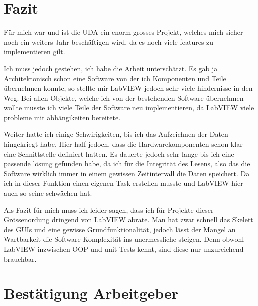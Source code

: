 \documentclass[10pt]{scrartcl}
\begin{document}
\section{Fazit}
Für mich war und ist die UDA ein enorm grosses Projekt, welches mich sicher noch ein weiters Jahr beschäftigen wird, da es noch viele features zu implementieren gilt.

Ich muss jedoch gestehen, ich habe die Arbeit unterschätzt. Es gab ja Architektonisch schon eine Software von der ich Komponenten und Teile übernehmen konnte, so stellte mir LabVIEW jedoch sehr viele hindernisse in den Weg. Bei allen Objekte, welche ich von der bestehenden Software übernehmen wollte musste ich viele Teile der Software neu implementieren, da LabVIEW viele probleme mit abhängikeiten bereitete.

Weiter hatte ich einige Schwirigkeiten, bis ich das Aufzeichnen der Daten hingekriegt habe. Hier half jedoch, dass die Hardwarekomponenten schon klar eine Schnittstelle definiert hatten. Es dauerte jedoch sehr lange bis ich eine passende lösung gefunden habe, da ich für die Integrität des Lesens, also das die Software wirklich immer in einem gewissen Zeitintervall die Daten speichert. Da ich in dieser Funktion einen eigenen Task erstellen musste und LabVIEW hier auch so seine schwächen hat.

Als Fazit für mich muss ich leider sagen, dass ich für Projekte dieser Grössenordung dringend von LabVIEW abrate. Man hat zwar schnell das Skelett des GUIs und eine gewisse Grundfunktionalität, jedoch lässt der Mangel an Wartbarkeit die Software Komplexität ins unermessliche steigen. Denn obwohl LabVIEW inzwischen OOP und unit Tests kennt, sind diese nur unzureichend brauchbar.
\section{Bestätigung Arbeitgeber}


\end{document}
